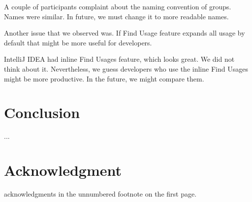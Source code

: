 \documentclass[conference]{IEEEtran}
\begin{document}
A couple of participants complaint about the naming convention of groups. Names were similar. In future, we must change it to more readable names.\par

Another issue that we observed was. If Find Usage feature expands all usage by default that might be more useful for developers.\par

IntelliJ IDEA had inline Find Usages feature, which looks great. We did not think about it. Nevertheless, we guess developers who use the inline Find Usages might be more productive. In the future, we might compare them. \par


\section{Conclusion}
...


\section*{Acknowledgment}

acknowledgments in the unnumbered footnote on the first page.




\end{document}
